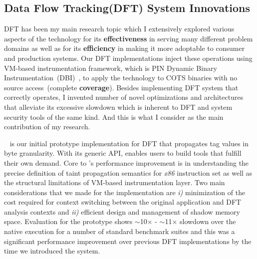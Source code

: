\documentclass[letterpaper, 10pt]{article}
\begin{document}
\begin{small}
\subsection*{Data Flow Tracking(DFT) System Innovations}
%
DFT has been my main research topic which I extensively explored various
aspects of the technology for its {\bf effectiveness} in serving many different
problem domains as well as for its {\bf efficiency} in making it more adoptable
to consumer and production systems.
%
%
Our DFT implementations inject these operations using VM-based instrumentation
framework, which is PIN Dynamic Binary Instrumentation~(DBI)~\cite{pin}, to
apply the technology to COTS binaries with no source access~(complete {\bf
coverage}).
%
Besides implementing DFT system that correctly operates, I invented number of
novel optimizations and architectures that alleviate its excessive slowdown
which is inherent to DFT and system security tools of the same kind. And this
is what I consider as the main contribution of my research.


\libdft~\cite{libdft:2012vee} is our initial prototype implementation for DFT
that propagates tag values in byte granularity.
%
With its generic API, \libdft enables users to build tools that fulfill their
own demand. 
%
%
Core to \libdft's performance improvement is in understanding the precise
definition of taint propagation semantics for {\it x86} instruction set as well
as the structural limitations of VM-based instrumentation layer. 
%
%
Two main considerations that we made for the implementation are {\it i)}
minimization of the cost required for context switching between the original
application and DFT analysis contexts and {\it ii)} efficient design and
management of shadow memory space.
%
Evaluation for the prototype shows $\sim$10$\times$ - $\sim$11$\times$ slowdown
over the native execution for a number of standard benchmark suites and this
was a significant performance improvement over previous DFT implementations by
the time we introduced the system.


\end{small}
\end{document}
